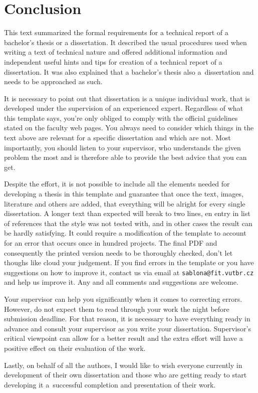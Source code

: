 \chapter{Conclusion}
\label{zaver}

This text summarized the formal requirements for a technical report of a bachelor's thesis or a dissertation. It described the usual procedures used when writing a text of technical nature and offered additional information and independent useful hints and tips for creation of a technical report of a dissertation. It was also explained that a bachelor's thesis also a~dissertation and needs to be approached as such.

It is necessary to point out that dissertation is a unique individual work, that is developed under the supervision of an experienced expert. Regardless of what this template says, you're only obliged to comply with the official guidelines stated on the faculty web pages. You always need to consider which things in the text above are relevant for a specific dissertation and which are not. Most importantly, you should listen to your supervisor, who understands the given problem the most and is therefore able to provide the best advice that you can get.

Despite the effort, it is not possible to include all the elements needed for developing a thesis in this template and guarantee that once the text, images, literature and others are added, that everything will be alright for every single dissertation. A longer text than expected will break to two lines, en entry in list of references that the style was not tested with, and in other cases the result can be hardly satisfying. It could require a modification of the template to account for an error that occurs once in hundred projects. The final PDF and consequently the printed version needs to be thoroughly checked, don't let thoughs like  cloud your judgement. If you find errors in the template or you have suggestions on how to improve it, contact us via email at \texttt{sablona@fit.vutbr.cz} and help us improve it. Any and all comments and suggestions are welcome.

Your supervisor can help you significantly when it comes to correcting errors. However, do not expect them to read through your work the night before submission deadline. For that reason, it is necessary to have everything ready in advance and consult your supervisor as you write your dissertation. Supervisor's critical viewpoint can allow for a better result and the extra effort will have a positive effect on their evaluation of the work.


Lastly, on behalf of all the authors, I would like to wish everyone currently in development of their own dissertation and those who are getting ready to start developing it a~successful completion and presentation of their work.
